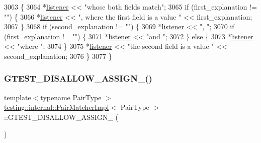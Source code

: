 \begin{DoxyCode}
3063                                                            \{
3064     *\hyperlink{namespaceinteractive__marker_a0e579ab555212bb5e2c9f8a675b7618a}{listener} << \textcolor{stringliteral}{"whose both fields match"};
3065     \textcolor{keywordflow}{if} (first\_explanation != \textcolor{stringliteral}{""}) \{
3066       *\hyperlink{namespaceinteractive__marker_a0e579ab555212bb5e2c9f8a675b7618a}{listener} << \textcolor{stringliteral}{", where the first field is a value "} << first\_explanation;
3067     \}
3068     \textcolor{keywordflow}{if} (second\_explanation != \textcolor{stringliteral}{""}) \{
3069       *\hyperlink{namespaceinteractive__marker_a0e579ab555212bb5e2c9f8a675b7618a}{listener} << \textcolor{stringliteral}{", "};
3070       \textcolor{keywordflow}{if} (first\_explanation != \textcolor{stringliteral}{""}) \{
3071         *\hyperlink{namespaceinteractive__marker_a0e579ab555212bb5e2c9f8a675b7618a}{listener} << \textcolor{stringliteral}{"and "};
3072       \} \textcolor{keywordflow}{else} \{
3073         *\hyperlink{namespaceinteractive__marker_a0e579ab555212bb5e2c9f8a675b7618a}{listener} << \textcolor{stringliteral}{"where "};
3074       \}
3075       *\hyperlink{namespaceinteractive__marker_a0e579ab555212bb5e2c9f8a675b7618a}{listener} << \textcolor{stringliteral}{"the second field is a value "} << second\_explanation;
3076     \}
3077   \}
\end{DoxyCode}
\mbox{\label{classtesting_1_1internal_1_1PairMatcherImpl_a4c662796fe757a60292da3177cf3152a}} 
\subsubsection{\texorpdfstring{G\+T\+E\+S\+T\+\_\+\+D\+I\+S\+A\+L\+L\+O\+W\+\_\+\+A\+S\+S\+I\+G\+N\+\_\+()}{GTEST\_DISALLOW\_ASSIGN\_()}}
{\footnotesize\ttfamily template$<$typename Pair\+Type $>$ \\
\hyperlink{classtesting_1_1internal_1_1PairMatcherImpl}{testing\+::internal\+::\+Pair\+Matcher\+Impl}$<$ Pair\+Type $>$\+::G\+T\+E\+S\+T\+\_\+\+D\+I\+S\+A\+L\+L\+O\+W\+\_\+\+A\+S\+S\+I\+G\+N\+\_\+ (\begin{DoxyParamCaption}\item[{\hyperlink{classtesting_1_1internal_1_1PairMatcherImpl}{Pair\+Matcher\+Impl}$<$ Pair\+Type $>$}]{ }\end{DoxyParamCaption})\hspace{0.3cm}{\ttfamily [private]}}

